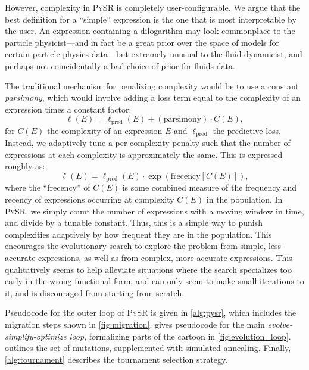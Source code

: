 \documentclass[letterpaper,twocolumn]{scrartcl}
\newcommand\pysr{\textsc{PySR}\xspace}
\begin{document}
\begin{linenumbers}
{    However, complexity in \pysr is completely user-configurable. We argue that the best definition for a ``simple'' expression is the one that is most interpretable by the user. An expression containing a dilogarithm may look commonplace to the particle physicist---and in fact be a great prior over the space of models for certain particle physics data---but extremely unusual to the fluid dynamicist, and perhaps not coincidentally a bad choice of prior for fluids data.
}

\noindent The traditional mechanism for penalizing complexity would be to use a constant \textit{parsimony}, which would involve adding a loss term equal to the complexity of an expression times a constant factor:
\begin{equation}
    \ell(E) = \ell_\text{pred}(E) + (\text{parsimony}) \cdot C(E),
\end{equation}
for $C(E)$ the complexity of an expression $E$ and $\ell_\text{pred}$ the predictive loss.
Instead, we adaptively tune a per-complexity penalty such that the number of expressions at each complexity is approximately the same.
This is expressed roughly as:
\begin{equation}
    \ell(E) = \ell_\text{pred}(E) \cdot \exp( \text{frecency}[C(E)]),
\end{equation}
where the ``frecency'' of $C(E)$ is some combined measure of the frequency and recency of expressions occurring at complexity $C(E)$ in the population.
In \pysr, we simply count the number of expressions with a moving window in time, and divide by a tunable constant.
Thus, this is a simple way to punish complexities adaptively by how frequent they are in the population.
This encourages the evolutionary search to explore the problem from simple, less-accurate expressions, as well as from complex, more accurate expressions.
This qualitatively seems to help alleviate situations where the search specializes too early in the wrong functional form, and can only seem to make small iterations to it, and is discouraged from starting from scratch.

Pseudocode for the outer loop of \pysr is given in \cref{alg:pysr}, which includes the migration steps shown in \cref{fig:migration}.
 gives pseudocode for the main \textit{evolve-simplify-optimize loop}, formalizing parts of the cartoon in \cref{fig:evolution_loop}.
 outlines the set of mutations, supplemented with simulated annealing.
Finally, \cref{alg:tournament} describes the tournament selection strategy.


\end{linenumbers}
\end{document}
